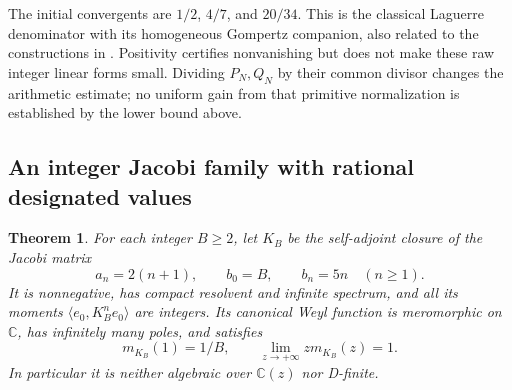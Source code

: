 \documentclass[11pt,a4paper]{article}
\newtheorem{theorem}{Theorem}[section]
\theoremstyle{definition}
\theoremstyle{remark}
\theoremstyle{plain}
\numberwithin{equation}{section}
\providecommand{\rcC}{\mathbb C}
\begin{document}
The initial convergents are $1/2$, $4/7$, and $20/34$.  This is the
classical Laguerre denominator with its homogeneous Gompertz companion,
also related to the constructions in \cite{sc:HP}.
Positivity certifies nonvanishing but does not make these raw integer
linear forms small.  Dividing $P_N,Q_N$ by their common divisor changes
the arithmetic estimate; no uniform gain from that primitive
normalization is established by the lower bound above.

\subsection{An integer Jacobi family with rational designated values}

\begin{theorem}\label{rc:thm:integer-jacobi}
For each integer $B\ge2$, let $K_B$ be the self-adjoint closure of the
Jacobi matrix
\begin{equation}\label{rc:eq:KB}
 a_n=2(n+1),\qquad b_0=B,\qquad b_n=5n\quad(n\ge1).
\end{equation}
It is nonnegative, has compact resolvent and infinite spectrum, and all
its moments $\langle e_0,K_B^ne_0\rangle$ are integers.  Its canonical
Weyl function is meromorphic on $\rcC$, has infinitely many poles, and
satisfies
\begin{equation}\label{rc:eq:KB-value}
 m_{K_B}(1)=1/B,\qquad \lim_{z\to+\infty}zm_{K_B}(z)=1.
\end{equation}
In particular it is neither algebraic over $\rcC(z)$ nor D-finite.
\end{theorem}
\end{document}
